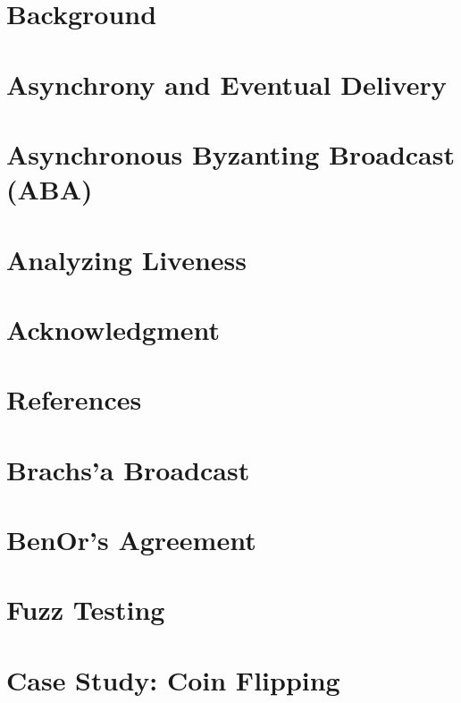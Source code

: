 \documentclass[conference]{IEEEtran}
\begin{document}
\section{Background} \label{sec:background}


\section{Asynchrony and Eventual Delivery} \label{sec:wrappers}


%

\section{Asynchronous Byzanting Broadcast (ABA)}


\section{Analyzing Liveness}


\section*{Acknowledgment}

\section*{References}

\appendix

\section{Brachs'a Broadcast}
%

\section{BenOr's Agreement}
%

%
\section{Fuzz Testing}


\section{Case Study: Coin Flipping}





\end{document}
